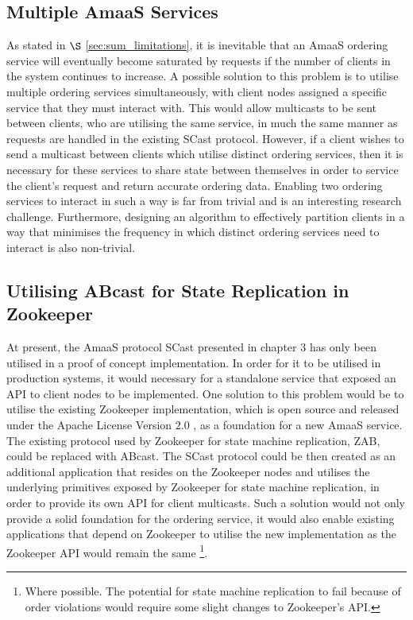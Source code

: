     \subsection{Multiple AmaaS Services}
    As stated in $\S$ \ref{sec:sum_limitations}, it is inevitable that an \textsf{AmaaS} ordering service will eventually become saturated by requests if the number of clients in the system continues to increase.  A possible solution to this problem is to utilise multiple ordering services simultaneously, with client nodes assigned a specific service that they must interact with.  This would allow multicasts to be sent between clients, who are utilising the same service, in much the same manner as requests are handled in the existing \textsf{SCast} protocol.  However, if a client wishes to send a multicast between clients which utilise distinct ordering services, then it is necessary for these services to share state between themselves in order to service the client's request and return accurate ordering data.  Enabling two ordering services to interact in such a way is far from trivial and is an interesting research challenge.  Furthermore, designing an algorithm to effectively partition clients in a way that minimises the frequency in which distinct ordering services need to interact is also non-trivial.  
        
    \subsection{Utilising ABcast for State Replication in Zookeeper}\label{sec:sum_fw_zoo}
    At present, the \textsf{AmaaS} protocol \textsf{SCast} presented in chapter 3 has only been utilised in a proof of concept implementation.  In order for it to be utilised in production systems, it would necessary for a standalone service that exposed an API to client nodes to be implemented.  One solution to this problem would be to utilise the existing Zookeeper implementation, which is open source and released under the Apache License Version $2.0$ \citep{ApacheLicense}, as a foundation for a new \textsf{AmaaS} service.  The existing protocol used by Zookeeper for state machine replication, ZAB, could be replaced with \textsf{ABcast}.  The \textsf{SCast} protocol could be then created as an additional application that resides on the Zookeeper nodes and utilises the underlying primitives exposed by Zookeeper for state machine replication, in order to provide its own API for client multicasts.  Such a solution would not only provide a solid foundation for the ordering service, it would also enable existing applications that depend on Zookeeper to utilise the new implementation as the Zookeeper API would remain the same \footnote{Where possible.  The potential for state machine replication to fail because of order violations would require some slight changes to Zookeeper's API.}.          
        
